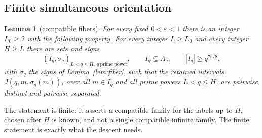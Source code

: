 \documentclass[11pt,letterpaper]{article}
\numberwithin{equation}{section}
\theoremstyle{plain}
\newtheorem{lemma}{Lemma}
\theoremstyle{remark}
\begin{document}
\subsection{Finite simultaneous orientation}\label{sec:orient}

\begin{lemma}[compatible fibers]\label{lem:orient}
For every fixed $0<\varepsilon<1$ there is an integer $L_0\ge2$ with the following property. For every integer $L\ge L_0$ and every integer $H\ge L$ there are sets and signs
\[
(I_q,\sigma_q)_{L<q\le H,\ q\ \text{prime power}},\qquad I_q\subseteq A_q,\qquad |I_q|\ge q^{7\varepsilon/8},
\]
with $\sigma_q$ the signs of Lemma~\ref{lem:fiber}, such that the retained intervals $J(q,m,\sigma_q(m))$, over all $m\in I_q$ and all prime powers $L<q\le H$, are pairwise distinct and pairwise separated.
\end{lemma}

The statement is finite: it asserts a compatible family for the labels up to $H$, chosen after $H$ is known, and not a single compatible infinite family. The finite statement is exactly what the descent needs.
\end{document}
